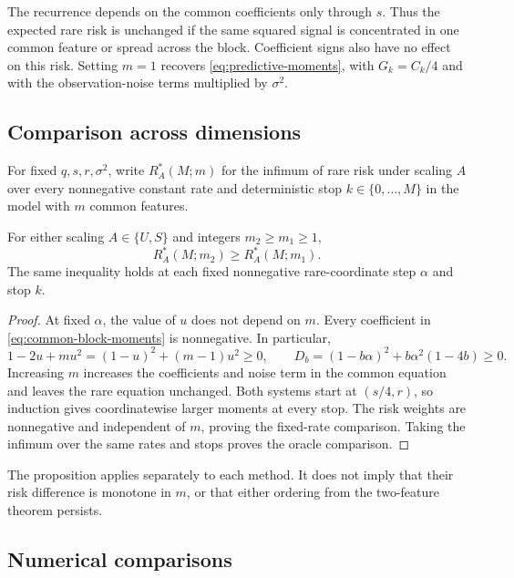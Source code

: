 \documentclass{alt2027}
\begin{document}
The recurrence depends on the common coefficients only through $s$. Thus the
expected rare risk is unchanged if the same squared signal is concentrated in
one common feature or spread across the block. Coefficient signs also have no
effect on this risk. Setting $m = 1$ recovers \cref{eq:predictive-moments}, with
$G_k = C_k/4$ and with the observation-noise terms multiplied by $\sigma^2$.

\subsection{Comparison across dimensions}

For fixed $q,s,r,\sigma^2$, write $R_A^*(M;m)$ for the infimum of rare risk
under scaling $A$ over every nonnegative constant rate and deterministic stop
$k \in \{0,\ldots,M\}$ in the model with $m$ common features.

\begin{proposition}
  For either scaling $A \in \{U,S\}$ and integers $m_2 \geq m_1 \geq 1$,
  \[
    R_A^*(M;m_2) \geq R_A^*(M;m_1).
  \]
  The same inequality holds at each fixed nonnegative rare-coordinate step
  $\alpha$ and stop $k$.
\end{proposition}

\begin{proof}
  At fixed $\alpha$, the value of $u$ does not depend on $m$. Every coefficient
  in \cref{eq:common-block-moments} is nonnegative. In particular,
  \[
    1 - 2u + mu^2 =    (1 - u)^2 + (m - 1)u^2
                  \geq 0, \qquad D_b
                  =    (1 - b\alpha)^2 + b\alpha^2(1 - 4b)
                  \geq 0.
  \]
  Increasing $m$ increases the coefficients and noise term in the common
  equation and leaves the rare equation unchanged. Both systems start at
  $(s/4,r)$, so induction gives coordinatewise larger moments at every stop. The
  risk weights are nonnegative and independent of $m$, proving the fixed-rate
  comparison. Taking the infimum over the same rates and stops proves the oracle
  comparison.
\end{proof}

The proposition applies separately to each method. It does not imply that their
risk difference is monotone in $m$, or that either ordering from the two-feature
theorem persists.

\subsection{Numerical comparisons}
\label{sec:common-block-numerics}
\end{document}
